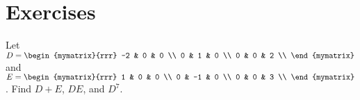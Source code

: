 \section*{Exercises}

\begin{ex}
  Let $D=\begin{mymatrix}{rrr}
    -2 & 0 & 0 \\
    0 & 1 & 0 \\
    0 & 0 & 2 \\
  \end{mymatrix}$ and
  $E=\begin{mymatrix}{rrr}
    1 & 0 & 0 \\
    0 & -1 & 0 \\
    0 & 0 & 3 \\
  \end{mymatrix}$.
  Find $D+E$, $DE$, and $D^7$.
\end{ex}


